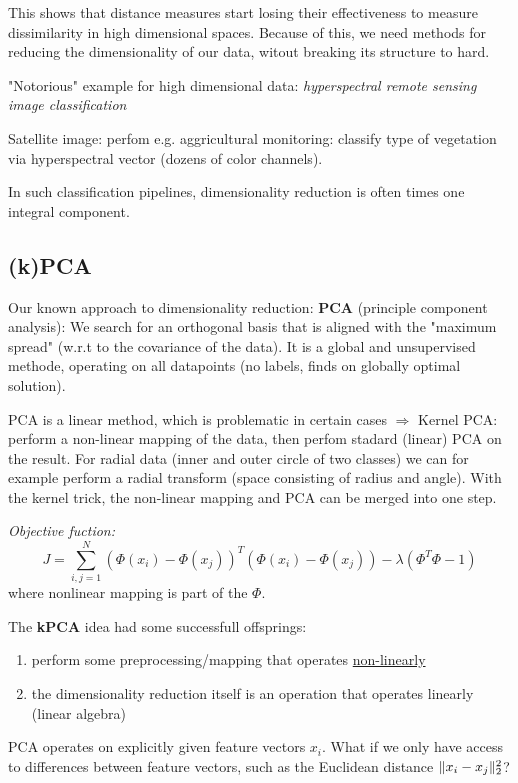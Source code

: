 \documentclass{scrartcl}
\DeclarePairedDelimiter\norm{\lVert}{\rVert}%
\begin{document}
This shows that distance measures start losing their effectiveness to measure dissimilarity in high dimensional spaces. Because of this, we need methods for reducing the dimensionality of our data, witout breaking its structure to hard.

\bigbreak

"Notorious" example for high dimensional data: \textit{hyperspectral remote sensing image classification}

Satellite image: perfom e.g. aggricultural monitoring: classify type of vegetation via hyperspectral vector (dozens of color channels).

In such classification pipelines, dimensionality reduction is often times one integral component.

\subsection{(k)PCA}

Our known approach to dimensionality reduction: \textbf{PCA} (principle component analysis): We search for an orthogonal basis that is aligned with the "maximum spread" (w.r.t to the covariance of the data). It is a global and unsupervised methode, operating on all datapoints (no labels, finds on globally optimal solution).

PCA is a linear method, which is problematic in certain cases \(\Rightarrow\) Kernel PCA: perform a non-linear mapping of the data, then perfom stadard (linear) PCA on the result. For radial data (inner and outer circle of two classes) we can for example perform a radial transform (space consisting of radius and angle). With the kernel trick, the non-linear mapping and PCA can be merged into one step.

\textit{Objective fuction:} \[J = \sum_{i,j=1}^N(\Phi(x_i) - \Phi(x_j))^T (\Phi(x_i) - \Phi(x_j)) - \lambda(\Phi^T \Phi - 1)\]
where nonlinear mapping is part of the \(\Phi\).

The \textbf{kPCA} idea had some successfull offsprings:
\begin{enumerate}
    \item
        perform some preprocessing/mapping that operates \underline{non-linearly}
    \item
        the dimensionality reduction itself is an operation that operates linearly (linear algebra)
\end{enumerate}

PCA operates on explicitly given feature vectors \(x_i\). What if we only have access to differences between feature vectors, such as the Euclidean distance \(\norm{x_i - x_j}_2^2\)?
\end{document}
